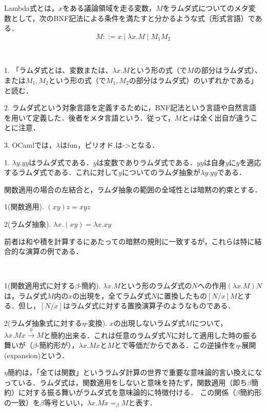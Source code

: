 \documentclass[uplatex, dvipdfmx]{jsreport}
\begin{document}
\begin{shadebox}\begin{definition}[Lambda式]
    Lambda式とは，$x$をある議論領域を走る変数，$M$をラムダ式についてのメタ変数として，次のBNF記法による条件を満たすと分かるような式（形式言語）である．
    \[ M::=x\mid\lambda x.M\mid M_1M_2 \]
\end{definition}\end{shadebox}
\begin{remark}　

    1. 「ラムダ式とは、変数または、$\lambda x.M$という形の式（で$M$の部分はラムダ式）、または$M_1,M_2$という形の式（で$M_1,M_2$の部分はラムダ式）のいずれかである」と読む．

    2. ラムダ式という対象言語を定義するために，BNF記法という言語や自然言語を用いて定義した．後者をメタ言語という．従って，$M$と$x$は全く出自が違うことに注意．

    3. OCamlでは，$\lambda$はfun，ピリオド.は->となる．
\end{remark}
\begin{example}

    1. $\lambda y.yy$はラムダ式である．$y$は変数でありラムダ式である．$yy$は自身$y$に$y$を適応するラムダ式である．これに対して$y$についてのラムダ抽象が$\lambda y.yy$である．
\end{example}

\begin{definition}[括弧の除去則]関数適用の場合の左結合と，ラムダ抽象の範囲の全域性とは暗黙の約束とする．
    
    1(関数適用). $(xy)z=xyz$

    2(ラムダ抽象). $\lambda x.(xy)=\lambda x.xy$
\end{definition}
\begin{remark}
    前者は和や積を計算するにあたっての暗黙の規則に一致するが，これらは特に結合的な演算の例である．
\end{remark}

\begin{definition}[計算規則]　

    1(関数適用式に対する$\beta$-簡約). $\lambda x.M$という形のラムダ式の$N$への作用$(\lambda x.M)N$は，ラムダ式$M$内の$x$の出現を，全てラムダ式$N$に置換したもの$[N/x]M$とする．但し，$[N/x]$はラムダ式に対する置換演算子のようなものである．

    2(ラムダ抽象式に対する$\eta$-変換). $x$の出現しないラムダ式$M$について，$\lambda x.Mx\xrightarrow{\eta}M$と簡約出来る．これは任意のラムダ式$N$に対して適用した時の振る舞いが（$\beta$-簡約形が），$\lambda x.Mx$と$M$とで等価だからである．この逆操作を$\eta$-展開(expansion)という．
\end{definition}
\begin{remark}
    $\eta$簡約は，「全ては関数」というラムダ計算の世界で重要な意味論的言い換えになっている．ラムダ式は，関数適用をしないと意味を持たず，関数適用（即ち$\beta$簡約）に対する振る舞いがラムダ式を意味論的に特徴付ける．
    この関係（$\beta$簡約形の一致）を$\beta$等号といい，$\lambda x.Mx=_\beta M$と表す．
\end{remark}
\end{document}
